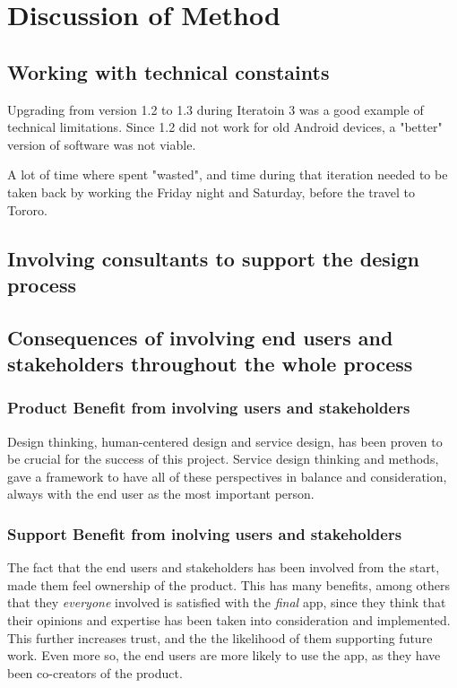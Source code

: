 \section{Discussion of Method}

\subsection{Working with technical constaints}
Upgrading from version 1.2 to 1.3 during Iteratoin 3 was a good example of technical limitations. Since 1.2 did not work for old Android devices, a "better" version of software was not viable.

A lot of time where spent "wasted", and time during that iteration needed to be taken back by working the Friday night and Saturday, before the travel to Tororo.

\subsection{Involving consultants to support the design process}


\subsection{Consequences of involving end users and stakeholders throughout the whole process}

\subsubsection{Product Benefit from involving users and stakeholders}
Design thinking, human-centered design and service design, has been proven to be crucial for the success of this project. Service design thinking and methods, gave a framework to have all of these perspectives in balance and consideration, always with the end user as the most important person.

\subsubsection{Support Benefit from inolving users and stakeholders}
The fact that the end users and stakeholders has been involved from the start, made them feel ownership of the product. This has many benefits, among others that they \textit{everyone} involved is satisfied with the \textit{final} app, since they think that their opinions and expertise has been taken into consideration and implemented. This further increases trust, and the the likelihood of them supporting future work. Even more so, the end users are more likely to use the app, as they have been co-creators of the product.

